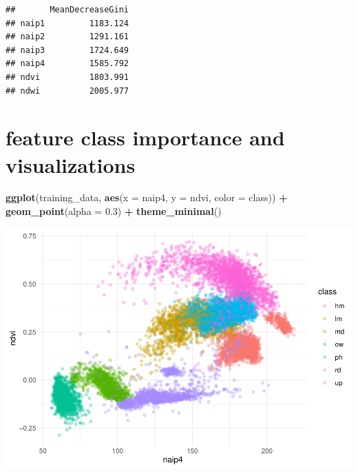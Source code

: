\documentclass[
]{article}
\newenvironment{Shaded}{\begin{snugshade}}{\end{snugshade}}
\newcommand{\AttributeTok}[1]{\textcolor[rgb]{0.13,0.29,0.53}{#1}}
\newcommand{\CommentTok}[1]{\textcolor[rgb]{0.56,0.35,0.01}{\textit{#1}}}
\newcommand{\FloatTok}[1]{\textcolor[rgb]{0.00,0.00,0.81}{#1}}
\newcommand{\FunctionTok}[1]{\textcolor[rgb]{0.13,0.29,0.53}{\textbf{#1}}}
\newcommand{\NormalTok}[1]{#1}
\newcommand{\OtherTok}[1]{\textcolor[rgb]{0.56,0.35,0.01}{#1}}
\newcommand{\SpecialCharTok}[1]{\textcolor[rgb]{0.81,0.36,0.00}{\textbf{#1}}}
\begin{document}
\begin{Shaded}
\end{Shaded}

\begin{verbatim}
##       MeanDecreaseGini
## naip1         1183.124
## naip2         1291.161
## naip3         1724.649
## naip4         1585.792
## ndvi          1803.991
## ndwi          2005.977
\end{verbatim}

\section{feature class importance and
visualizations}\label{feature-class-importance-and-visualizations-1}

\begin{Shaded}
\begin{Highlighting}[]
\FunctionTok{ggplot}\NormalTok{(training\_data, }\FunctionTok{aes}\NormalTok{(}\AttributeTok{x =}\NormalTok{ naip4, }\AttributeTok{y =}\NormalTok{ ndvi, }\AttributeTok{color =}\NormalTok{ class)) }\SpecialCharTok{+}
  \FunctionTok{geom\_point}\NormalTok{(}\AttributeTok{alpha =} \FloatTok{0.3}\NormalTok{) }\SpecialCharTok{+}
  \FunctionTok{theme\_minimal}\NormalTok{()}
\end{Highlighting}
\end{Shaded}

\includegraphics{veg_model_files/figure-latex/unnamed-chunk-9-1.pdf}
\end{document}
